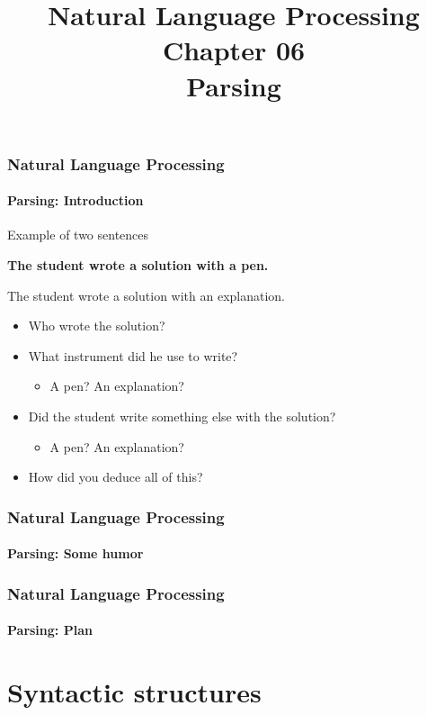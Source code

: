 \documentclass[xcolor=table]{beamer}
\title[ESI - NLP: 06- Parsing]%
{Natural Language Processing\\Chapter 06\\Parsing}
\begin{document}
	
\begin{frame}
\frametitle{Natural Language Processing}
\framesubtitle{Parsing: Introduction}

\begin{exampleblock}{Example of two sentences}
	\begin{center}
		\Large\bfseries
		The student wrote a solution with a pen. 
		
		The student wrote a solution with an explanation.
	\end{center}
\end{exampleblock}

\begin{itemize}
	\item Who wrote the solution?
	\item What instrument did he use to write?
	\begin{itemize}
		\item A pen? An explanation?
	\end{itemize}
	\item Did the student write something else with the solution?
	\begin{itemize}
		\item A pen? An explanation?
	\end{itemize}
	\item How did you deduce all of this?
\end{itemize}

\end{frame}

\begin{frame}
\frametitle{Natural Language Processing}
\framesubtitle{Parsing: Some humor}

\begin{center}
\end{center}

\end{frame}

\begin{frame}
\frametitle{Natural Language Processing}
\framesubtitle{Parsing: Plan}

\begin{multicols}{2}
\tableofcontents
\end{multicols}
\end{frame}

\section{Syntactic structures}
\end{document}
